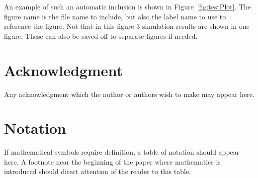 \documentclass[]{BasiliskReportMemo}
\begin{document}
An example of such an automatic inclusion is shown in Figure~\ref{fig:testPlot}.  The figure name is the file name to include, but also the label name to use to reference the figure.  Not that in this figure 3 simulation results are shown in one figure.  These can also be saved off to separate figures if needed.





\section{Acknowledgment}
Any acknowledgment which the author or authors wish to make may appear here. 



\section{Notation}
If mathematical symbols require definition, a table of notation should appear here. A footnote near the beginning of the paper where mathematics is introduced should direct attention of the reader to this table.
\end{document}
